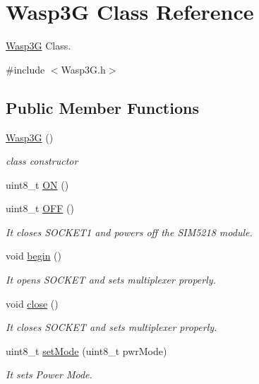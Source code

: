 \hypertarget{class_wasp3_g}{}\section{Wasp3G Class Reference}
\label{class_wasp3_g}


\hyperlink{class_wasp3_g}{Wasp3G} Class.  




{\ttfamily \#include $<$Wasp3\+G.\+h$>$}

\subsection*{Public Member Functions}
\begin{DoxyCompactItemize}
\item 
\hyperlink{class_wasp3_g_abd70a83e3b7857a38b31ea193d78e786}{Wasp3G} ()
\begin{DoxyCompactList}\small\item\em class constructor \end{DoxyCompactList}\item 
uint8\+\_\+t \hyperlink{class_wasp3_g_aa595b4acbe2ec2e96670106e2744945b}{ON} ()
\item 
uint8\+\_\+t \hyperlink{class_wasp3_g_ac7fa2c8343b538b6d6ea1fcc346aa39a}{O\+FF} ()
\begin{DoxyCompactList}\small\item\em It closes S\+O\+C\+K\+E\+T1 and powers off the S\+I\+M5218 module. \end{DoxyCompactList}\item 
void \hyperlink{class_wasp3_g_ab25072ca69374672fae84350332e2b76}{begin} ()
\begin{DoxyCompactList}\small\item\em It opens S\+O\+C\+K\+ET and sets multiplexer properly. \end{DoxyCompactList}\item 
void \hyperlink{class_wasp3_g_a5ea079094707ab410b4d1564bf33d0ac}{close} ()
\begin{DoxyCompactList}\small\item\em It closes S\+O\+C\+K\+ET and sets multiplexer properly. \end{DoxyCompactList}\item 
uint8\+\_\+t \hyperlink{class_wasp3_g_a90179b69fdb1abb98bcd0f0440f4f84b}{set\+Mode} (uint8\+\_\+t pwr\+Mode)
\begin{DoxyCompactList}\small\item\em It sets Power Mode. \end{DoxyCompactList}\item 

\end{DoxyCompactItemize}
